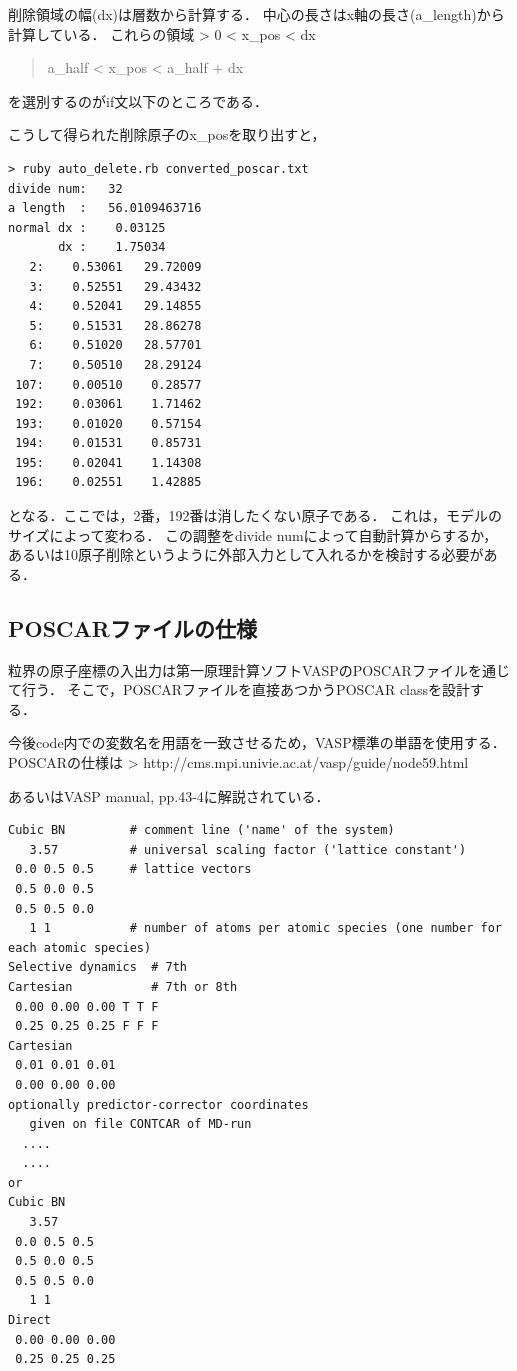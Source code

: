 \documentclass[11pt,dvipdfmx]{jsarticle}
\begin{document}
削除領域の幅(dx)は層数から計算する．
中心の長さはx軸の長さ(a\_length)から計算している． これらの領域
\textgreater{} 0 \textless{} x\_pos \textless{} dx

\begin{quote}
a\_half \textless{} x\_pos \textless{} a\_half + dx
\end{quote}
を選別するのがif文以下のところである．

こうして得られた削除原子のx\_posを取り出すと，

\begin{verbatim}
> ruby auto_delete.rb converted_poscar.txt 
divide num:   32
a length  :   56.0109463716
normal dx :    0.03125
       dx :    1.75034
   2:    0.53061   29.72009
   3:    0.52551   29.43432
   4:    0.52041   29.14855
   5:    0.51531   28.86278
   6:    0.51020   28.57701
   7:    0.50510   28.29124
 107:    0.00510    0.28577
 192:    0.03061    1.71462
 193:    0.01020    0.57154
 194:    0.01531    0.85731
 195:    0.02041    1.14308
 196:    0.02551    1.42885
\end{verbatim}

となる．ここでは，2番，192番は消したくない原子である．
これは，モデルのサイズによって変わる． この調整をdivide
numによって自動計算からするか，
あるいは10原子削除というように外部入力として入れるかを検討する必要がある．

    \subsection{POSCARファイルの仕様}\label{poscarux30d5ux30a1ux30a4ux30ebux306eux4ed5ux69d8}

粒界の原子座標の入出力は第一原理計算ソフトVASPのPOSCARファイルを通じて行う．
そこで，POSCARファイルを直接あつかうPOSCAR classを設計する．

今後code内での変数名を用語を一致させるため，VASP標準の単語を使用する．
POSCARの仕様は \textgreater{}
http://cms.mpi.univie.ac.at/vasp/guide/node59.html

あるいはVASP manual, pp.43-4に解説されている．

\begin{verbatim}
Cubic BN         # comment line ('name' of the system)
   3.57          # universal scaling factor ('lattice constant')
 0.0 0.5 0.5     # lattice vectors
 0.5 0.0 0.5  
 0.5 0.5 0.0
   1 1           # number of atoms per atomic species (one number for each atomic species)
Selective dynamics  # 7th
Cartesian           # 7th or 8th
 0.00 0.00 0.00 T T F
 0.25 0.25 0.25 F F F
Cartesian
 0.01 0.01 0.01
 0.00 0.00 0.00
optionally predictor-corrector coordinates 
   given on file CONTCAR of MD-run
  ....
  ....
or
Cubic BN
   3.57
 0.0 0.5 0.5
 0.5 0.0 0.5
 0.5 0.5 0.0
   1 1
Direct
 0.00 0.00 0.00 
 0.25 0.25 0.25
\end{verbatim}
\end{document}

